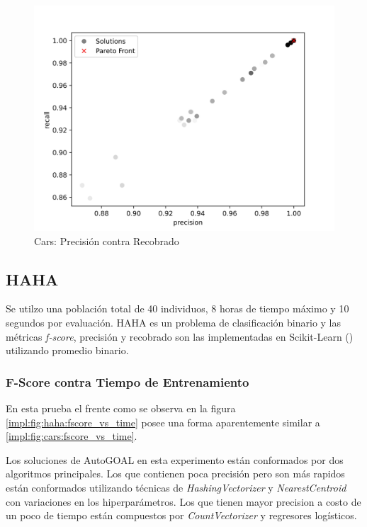 \begin{figure}[ht]
    \centering
    \includegraphics[scale=0.65]{Pictures/cars_precision_vs_recall.jpg}
    \caption{Cars: Precisi\'on contra Recobrado}
    \label{impl:fig:cars:precision_vs_recall}
\end{figure}

\subsection{HAHA}
Se utilzo una poblaci\'on total de 40 individuos, 8 horas de tiempo m\'aximo y 10 segundos por  evaluaci\'on. 
HAHA es un problema de clasificaci\'on binario y las m\'etricas \textit{f-score}, precisi\'on y recobrado son las implementadas en Scikit-Learn (\cite{pedregosa2011scikit}) utilizando promedio binario.

\subsubsection{F-Score contra Tiempo de Entrenamiento}

En esta prueba el frente como se observa en la figura \ref{impl:fig:haha:fscore_vs_time} posee una forma aparentemente similar a \ref{impl:fig:cars:fscore_vs_time}. 

Los soluciones de AutoGOAL en esta experimento est\'an conformados por dos algoritmos principales. Los que contienen poca precisi\'on pero son m\'as rapidos est\'an conformados utilizando t\'ecnicas de \textit{HashingVectorizer} y \textit{NearestCentroid} con variaciones en los hiperpar\'ametros.
Los que tienen mayor precision a costo de un poco de tiempo est\'an compuestos por \textit{CountVectorizer}  y regresores log\'isticos.

